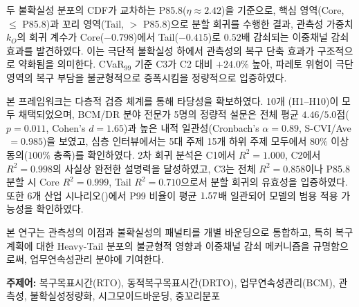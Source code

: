 {두 불확실성 분포의 CDF가 교차하는 P85.8($\eta \approx 2.42$)을 기준으로, 핵심 영역(Core, $\leq$ P85.8)과 꼬리 영역(Tail, $>$ P85.8)으로 분할 회귀를 수행한 결과, 관측성 가중치 $k_O$의 회귀 계수가 Core($-0.798$)에서 Tail($-0.415$)로 $0.52$배 감쇠되는 이중채널 감쇠 효과를 발견하였다. 이는 극단적 불확실성 하에서 관측성의 복구 단축 효과가 구조적으로 약화됨을 의미한다. CVaR$_{99}$ 기준 C3가 C2 대비 $+24.0\%$ 높아, 파레토 위험이 극단 영역의 복구 부담을 불균형적으로 증폭시킴을 정량적으로 입증하였다.

본 프레임워크는 다층적 검증 체계를 통해 타당성을 확보하였다. 10개 (H1--H10)이 모두 채택되었으며, BCM/DR 분야 전문가 5명의 정량적 설문은 전체 평균 $4.46/5.0$점($p = 0.011$, Cohen's $d = 1.65$)과 높은 내적 일관성(Cronbach's $\alpha = 0.89$, S-CVI/Ave$\,= 0.985$)을 보였고, 심층 인터뷰에서는 5대 주제 15개 하위 주제 모두에서 $80\%$ 이상 동의($100\%$ 충족)를 확인하였다. 2차 회귀 분석은 C1에서 $R^2 = 1.000$, C2에서 $R^2 = 0.998$의 사실상 완전한 설명력을 달성하였고, C3는 전체 $R^2 = 0.858$이나 P85.8 분할 시 Core $R^2 = 0.999$, Tail $R^2 = 0.710$으로서 분할 회귀의 유효성을 입증하였다. 또한 6개 산업 시나리오()에서 P99 비율이 평균 $\erf{1.57}{1.66}$배 일관되어 모델의 범용 적용 가능성을 확인하였다.

본 연구는 관측성의 이점과 불확실성의 패널티를 개별 바운딩으로 통합하고, 특히 복구 계획에 대한 Heavy-Tail 분포의 불균형적 영향과 이중채널 감쇠 메커니즘을 규명함으로써,  업무연속성관리 분야에 기여한다. 

\vspace{10mm}
\noindent\textbf{주제어:} 복구목표시간(RTO), 동적복구목표시간(DRTO), 업무연속성관리(BCM), 관측성, 불확실성정량화, 시그모이드바운딩, 중꼬리분포

}
